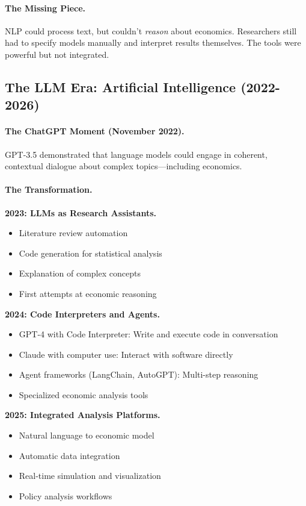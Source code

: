 \paragraph{The Missing Piece.}
NLP could process text, but couldn't \emph{reason} about economics.
Researchers still had to specify models manually and interpret results themselves.
The tools were powerful but not integrated.

\subsection{The LLM Era: Artificial Intelligence (2022-2026)}

\paragraph{The ChatGPT Moment (November 2022).}
GPT-3.5 demonstrated that language models could engage in coherent,
contextual dialogue about complex topics---including economics.

\paragraph{The Transformation.}

\textbf{2023: LLMs as Research Assistants.}
\begin{itemize}
  \item Literature review automation
  \item Code generation for statistical analysis
  \item Explanation of complex concepts
  \item First attempts at economic reasoning
\end{itemize}

\textbf{2024: Code Interpreters and Agents.}
\begin{itemize}
  \item GPT-4 with Code Interpreter: Write and execute code in conversation
  \item Claude with computer use: Interact with software directly
  \item Agent frameworks (LangChain, AutoGPT): Multi-step reasoning
  \item Specialized economic analysis tools
\end{itemize}

\textbf{2025: Integrated Analysis Platforms.}
\begin{itemize}
  \item Natural language to economic model
  \item Automatic data integration
  \item Real-time simulation and visualization
  \item Policy analysis workflows
\end{itemize}

